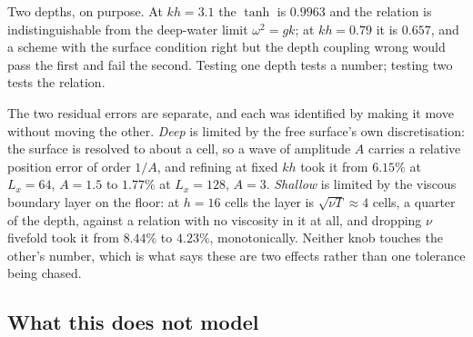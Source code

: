 \documentclass[11pt,a4paper]{article}
\begin{document}
Two depths, on purpose. At $kh = 3.1$ the $\tanh$ is $0.9963$ and the relation
is indistinguishable from the deep-water limit $\omega^2 = gk$; at $kh = 0.79$
it is $0.657$, and a scheme with the surface condition right but the depth
coupling wrong would pass the first and fail the second. Testing one depth tests
a number; testing two tests the relation.

The two residual errors are separate, and each was identified by making it move
without moving the other. \emph{Deep} is limited by the free surface's own
discretisation: the surface is resolved to about a cell, so a wave of amplitude
$A$ carries a relative position error of order $1/A$, and refining at fixed $kh$
took it from $6.15\%$ at $L_x = 64$, $A = 1.5$ to $1.77\%$ at $L_x = 128$,
$A = 3$. \emph{Shallow} is limited by the viscous boundary layer on the floor:
at $h = 16$ cells the layer is $\sqrt{\nu T} \approx 4$ cells, a quarter of the
depth, against a relation with no viscosity in it at all, and dropping $\nu$
fivefold took it from $8.44\%$ to $4.23\%$, monotonically. Neither knob touches
the other's number, which is what says these are two effects rather than one
tolerance being chased.

\subsection{What this does not model}
\end{document}
